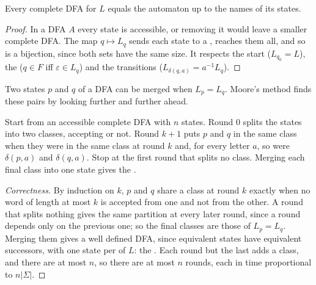 \begin{corollary}[Uniqueness]\label{cor:b2:regular-languages:unique-minimal}
Every  complete DFA for $L$ equals the  automaton up to the names of its states.
\end{corollary}

\begin{proof}
In a  DFA $A$ every state is accessible, or removing it would leave a smaller complete DFA. The map $q \mapsto
L_q$ sends each state to a , reaches them all, and so is a bijection, since both sets have the same size. It
respects the start ($L_{q_0} = L$), the  ($q \in F$ iff $\varepsilon \in L_q$) and the transitions
($L_{\delta(q, a)} = a^{-1}L_q$).
\end{proof}

Two states $p$ and $q$ of a DFA can be merged when $L_p = L_q$. Moore's method finds these pairs by looking further and
further ahead.

\begin{method}\label{met:b2:regular-languages:moore}
Start from an accessible complete DFA with $n$ states. Round 0 splits the states into two classes, accepting or not.
Round $k + 1$ puts $p$ and $q$ in the same class when they were in the same class at round $k$ and, for every letter
$a$, so were $\delta(p, a)$ and $\delta(q, a)$. Stop at the first round that splits no class. Merging each final class
into one state gives the .
\end{method}

\begin{proof}[Correctness]
By induction on $k$, $p$ and $q$ share a class at round $k$ exactly when no word of length at most $k$ is accepted
from one and not from the other. A round that splits nothing gives the same partition at every later round, since a
round depends only on the previous one; so the final classes are those of $L_p = L_q$. Merging them gives a well
defined DFA, since equivalent states have equivalent successors, with one state per  of $L$: the . Each round but the last adds a class, and there are at most $n$, so there are at most $n$ rounds, each in
time proportional to $n|\Sigma|$.
\end{proof}

